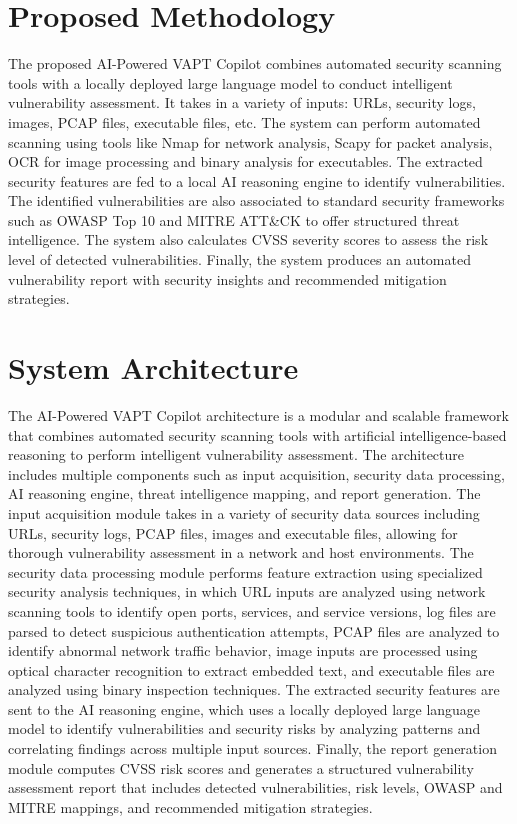 \documentclass[journal]{IEEEtran}
\begin{document}
\section{Proposed Methodology}
The proposed AI-Powered VAPT Copilot combines automated security scanning tools with a locally deployed large language model to conduct intelligent vulnerability assessment. It takes in a variety of inputs: URLs, security logs, images, PCAP files, executable files, etc. The system can perform automated scanning using tools like Nmap for network analysis, Scapy for packet analysis, OCR for image processing and binary analysis for executables. The extracted security features are fed to a local AI reasoning engine to identify vulnerabilities. The identified vulnerabilities are also associated to standard security frameworks such as OWASP Top 10 and MITRE ATT\&CK to offer structured threat intelligence. The system also calculates CVSS severity scores to assess the risk level of detected vulnerabilities. Finally, the system produces an automated vulnerability report with security insights and recommended mitigation strategies.


\section{System Architecture}
The AI-Powered VAPT Copilot architecture is a modular and scalable framework that combines automated security scanning tools with artificial intelligence-based reasoning to perform intelligent vulnerability assessment. The architecture includes multiple components such as input acquisition, security data processing, AI reasoning engine, threat intelligence mapping, and report generation. The input acquisition module takes in a variety of security data sources including URLs, security logs, PCAP files, images and executable files, allowing for thorough vulnerability assessment in a network and host environments. The security data processing module performs feature extraction using specialized security analysis techniques, in which URL inputs are analyzed using network scanning tools to identify open ports, services, and service versions, log files are parsed to detect suspicious authentication attempts, PCAP files are analyzed to identify abnormal network traffic behavior, image inputs are processed using optical character recognition to extract embedded text, and executable files are analyzed using binary inspection techniques. The extracted security features are sent to the AI reasoning engine, which uses a locally deployed large language model to identify vulnerabilities and security risks by analyzing patterns and correlating findings across multiple input sources. Finally, the report generation module computes CVSS risk scores and generates a structured vulnerability assessment report that includes detected vulnerabilities, risk levels, OWASP and MITRE mappings, and recommended mitigation strategies.
\end{document}

